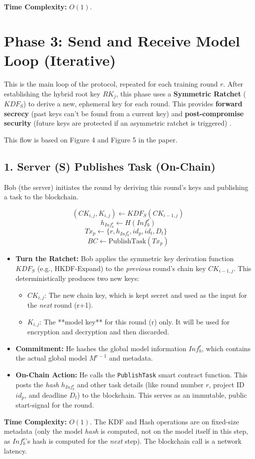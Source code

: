 \documentclass[12pt]{article}
\begin{document}
\textbf{Time Complexity:} \( O(1) \).

\newpage

\section*{Phase 3: Send and Receive Model Loop (Iterative)}

This is the main loop of the protocol, repeated for each training round \( r \). After establishing the hybrid root key \( RK_j \), this phase uses a \textbf{Symmetric Ratchet} (\( KDF_S \)) to derive a new, ephemeral key for each round. This provides \textbf{forward secrecy} (past keys can't be found from a current key) and \textbf{post-compromise security} (future keys are protected if an asymmetric ratchet is triggered) .

This flow is based on Figure 4 and Figure 5 in the paper.



\subsection*{1. Server (S) Publishes Task (On-Chain)}
Bob (the server) initiates the round by deriving this round's keys and publishing a task to the blockchain.

\[
(CK_{i,j}, K_{i,j}) \leftarrow KDF_S(CK_{i-1,j})
\]
\[
h_{Inf_b^r} \leftarrow H(Inf_b^r)
\]
\[
Tx_p \leftarrow \{r, h_{Inf_b^r}, id_p, id_t, D_t\} \text{ }
\]
\[
BC \leftarrow \text{PublishTask}(Tx_p)
\]

\begin{itemize}
    \item \textbf{Turn the Ratchet:} Bob applies the symmetric key derivation function \( KDF_S \) (e.g., HKDF-Expand) to the \textit{previous} round's chain key \( CK_{i-1,j} \). This deterministically produces two new keys:
    \begin{itemize}
        \item \( CK_{i,j} \): The new chain key, which is kept secret and used as the input for the \textit{next} round (r+1).
        \item \( K_{i,j} \): The **model key** for this round (r) only. It will be used for encryption and decryption and then discarded.
    \end{itemize}
    \item \textbf{Commitment:} He hashes the global model information \( Inf_b^r \), which contains the actual global model \( M^{r-1} \) and metadata.
    \item \textbf{On-Chain Action:} He calls the \texttt{PublishTask} smart contract function. This posts the \textit{hash} \( h_{Inf_b^r} \) and other task details (like round number \( r \), project ID \( id_p \), and deadline \( D_t \)) to the blockchain. This serves as an immutable, public start-signal for the round.
\end{itemize}
\textbf{Time Complexity:} \( O(1) \). The KDF and Hash operations are on fixed-size metadata (only the model \textit{hash} is computed, not on the model itself in this step, as \(Inf_b^r\)'s hash is computed for the \textit{next} step). The blockchain call is a network latency.
\end{document}
